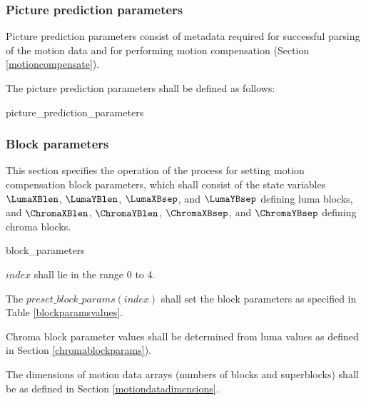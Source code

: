 \subsubsection{Picture prediction parameters}
\label{picpredparams}

Picture prediction parameters consist of metadata required for successful parsing of the
motion data and for performing motion compensation (Section \ref{motioncompensate}).

The picture prediction parameters shall be defined as follows:

\begin{pseudo}{picture\_prediction\_parameters}{}
\end{pseudo}

\subsubsection{Block parameters}
\label{blockparameters}

This section specifies the operation of the process for
setting motion compensation block parameters, which shall consist of the state variables
$\LumaXBlen$, $\LumaYBlen$, $\LumaXBsep$, and $\LumaYBsep$
defining luma blocks, and $\ChromaXBlen$, $\ChromaYBlen$, $\ChromaXBsep$,
and $\ChromaYBsep$ defining chroma blocks. 

\begin{pseudo}{block\_parameters}{}
\bsELSE
\bsEND
{}
\end{pseudo}

$index$ shall lie in the range 0 to 4. 

The $preset\_block\_params(index)$ shall set the block parameters as specified
in Table \ref{blockparamsvalues}.

Chroma block parameter values shall be determined from luma values
as defined in Section \ref{chromablockparams}).

The dimensions of motion data arrays (numbers of blocks and superblocks) shall
be as defined in Section \ref{motiondatadimensions}.

